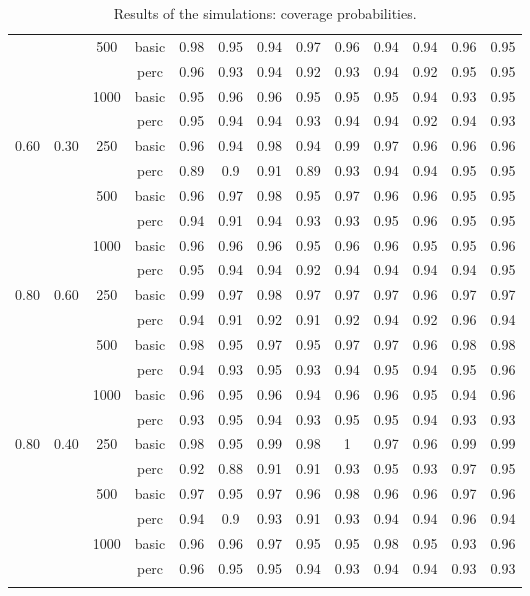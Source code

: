 {\begin{longtable}{cccc|ccccc|cccc}
   &  & 500 & basic & 0.98 & 0.95 & 0.94 & 0.97 & 0.96 & 0.94 & 0.94 & 0.96 & 0.95 \\ 
   &  &  & perc & 0.96 & 0.93 & 0.94 & 0.92 & 0.93 & 0.94 & 0.92 & 0.95 & 0.95 \\ 
   &  & 1000 & basic & 0.95 & 0.96 & 0.96 & 0.95 & 0.95 & 0.95 & 0.94 & 0.93 & 0.95 \\ 
   &  &  & perc & 0.95 & 0.94 & 0.94 & 0.93 & 0.94 & 0.94 & 0.92 & 0.94 & 0.93 \\ 
\midrule
  0.60 & 0.30 & 250 & basic & 0.96 & 0.94 & 0.98 & 0.94 & 0.99 & 0.97 & 0.96 & 0.96 & 0.96 \\ 
   &  &  & perc & 0.89 & 0.9 & 0.91 & 0.89 & 0.93 & 0.94 & 0.94 & 0.95 & 0.95 \\ 
   &  & 500 & basic & 0.96 & 0.97 & 0.98 & 0.95 & 0.97 & 0.96 & 0.96 & 0.95 & 0.95 \\ 
   &  &  & perc & 0.94 & 0.91 & 0.94 & 0.93 & 0.93 & 0.95 & 0.96 & 0.95 & 0.95 \\ 
   &  & 1000 & basic & 0.96 & 0.96 & 0.96 & 0.95 & 0.96 & 0.96 & 0.95 & 0.95 & 0.96 \\ 
   &  &  & perc & 0.95 & 0.94 & 0.94 & 0.92 & 0.94 & 0.94 & 0.94 & 0.94 & 0.95 \\ 
\midrule
  0.80 & 0.60 & 250 & basic & 0.99 & 0.97 & 0.98 & 0.97 & 0.97 & 0.97 & 0.96 & 0.97 & 0.97 \\ 
   &  &  & perc & 0.94 & 0.91 & 0.92 & 0.91 & 0.92 & 0.94 & 0.92 & 0.96 & 0.94 \\ 
   &  & 500 & basic & 0.98 & 0.95 & 0.97 & 0.95 & 0.97 & 0.97 & 0.96 & 0.98 & 0.98 \\ 
   &  &  & perc & 0.94 & 0.93 & 0.95 & 0.93 & 0.94 & 0.95 & 0.94 & 0.95 & 0.96 \\ 
   &  & 1000 & basic & 0.96 & 0.95 & 0.96 & 0.94 & 0.96 & 0.96 & 0.95 & 0.94 & 0.96 \\ 
   &  &  & perc & 0.93 & 0.95 & 0.94 & 0.93 & 0.95 & 0.95 & 0.94 & 0.93 & 0.93 \\ 
\midrule
  0.80 & 0.40 & 250 & basic & 0.98 & 0.95 & 0.99 & 0.98 & 1 & 0.97 & 0.96 & 0.99 & 0.99 \\ 
   &  &  & perc & 0.92 & 0.88 & 0.91 & 0.91 & 0.93 & 0.95 & 0.93 & 0.97 & 0.95 \\ 
   &  & 500 & basic & 0.97 & 0.95 & 0.97 & 0.96 & 0.98 & 0.96 & 0.96 & 0.97 & 0.96 \\ 
   &  &  & perc & 0.94 & 0.9 & 0.93 & 0.91 & 0.93 & 0.94 & 0.94 & 0.96 & 0.94 \\ 
   &  & 1000 & basic & 0.96 & 0.96 & 0.97 & 0.95 & 0.95 & 0.98 & 0.95 & 0.93 & 0.96 \\ 
   &  &  & perc & 0.96 & 0.95 & 0.95 & 0.94 & 0.93 & 0.94 & 0.94 & 0.93 & 0.93 \\ 
\bottomrule
\caption{Results of the simulations: coverage probabilities.} 
\label{table:res_sim_cov_prob}
\end{longtable}
}




